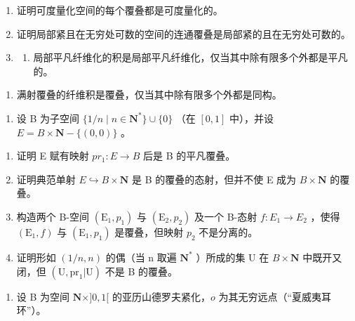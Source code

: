 \exercisegroup

\begin{enumerate}
\def\labelenumi{\arabic{enumi})}
\item
  证明可度量化空间的每个覆叠都是可度量化的。
\item
  证明局部紧且在无穷处可数的空间的连通覆叠是局部紧的且在无穷处可数的。
\item
  \begin{enumerate}
  \def\labelenumii{\alph{enumii})}
  \tightlist
  \item
    局部平凡纤维化的积是局部平凡纤维化，仅当其中除有限多个外都是平凡的。
  \end{enumerate}
\end{enumerate}

\begin{enumerate}
\def\labelenumi{\alph{enumi})}
\setcounter{enumi}{1}
\tightlist
\item
  满射覆叠的纤维积是覆叠，仅当其中除有限多个外都是同构。
\end{enumerate}

\begin{enumerate}
\def\labelenumi{\arabic{enumi})}
\setcounter{enumi}{3}
\tightlist
\item
  设 B 为子空间 \(\{1/n \mid n \in \mathbf{N}^*\} \cup \{0\}\) （在 \([0,1]\) 中），并设 \(E = B \times \mathbf{N} - \{(0,0)\}\) 。
\end{enumerate}

\begin{enumerate}
\def\labelenumi{\alph{enumi})}
\item
  证明 E 赋有映射 \(pr_{1}: E \to B\) 后是 B 的平凡覆叠。
\item
  证明典范单射 \(E \hookrightarrow B \times \mathbf{N}\) 是 B 的覆叠的态射，但并不使 E 成为 \(B \times \mathbf{N}\) 的覆叠。
\item
  构造两个 B-空间 \((\mathrm{E}_{1}, p_{1})\) 与 \((\mathrm{E}_{2}, p_{2})\) 及一个 B-态射 \(f: E_{1} \to E_{2}\) ，使得 \((\mathrm{E}_{1}, f)\) 与 \((\mathrm{E}_{1}, p_{1})\) 是覆叠，但映射 \(p_{2}\) 不是分离的。
\item
  证明形如 \((1/n,n)\) 的偶（当 n 取遍 \(\mathbf{N}^{*}\) ）所成的集 U 在 \(B \times \mathbf{N}\) 中既开又闭，但 \((\mathrm{U},\mathrm{pr}_{1}|\mathrm{U})\) 不是 B 的覆叠。
\end{enumerate}

\begin{enumerate}
\def\labelenumi{\arabic{enumi})}
\setcounter{enumi}{4}
\tightlist
\item
  设 B 为空间 \(\mathbf{N} \times ]0,1[\) 的亚历山德罗夫紧化，\(o\) 为其无穷远点（“夏威夷耳环”）。
\end{enumerate}

